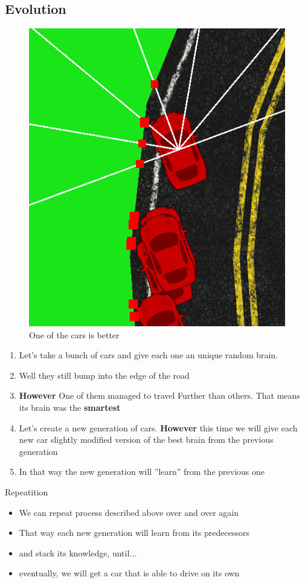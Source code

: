 \documentclass[10pt,a4paper]{article}
\begin{document}
\subsection{Evolution}
\begin{figure}[!h]
	\centering
    \includegraphics[scale=0.5]{evolution.png}
	\centering
    \caption{\tiny One of the cars is better}
\end{figure}
\begin{enumerate}
    \item Let’s take a bunch of cars and give each one an unique random brain.
    \item Well they still bump into the edge of the road
    \item \textbf{However} One of them managed to travel Further than others. That means its brain was the \textbf{smartest}
    \item Let’s create a new generation of cars. \textbf{However} this time we will give each new car slightly modified version of
    the best brain from the previous generation
    \item In that way the new generation will ”learn” from the previous one
\end{enumerate}
\Large{Repeatition}
\normalsize
\begin{itemize}
    \item We can repeat process described above over and over again
    \item That way each new generation will learn from its predecessors
    \item and stack its knowledge, until...
    \item eventually, we will get a car that is able to drive on its own
\end{itemize}
\end{document}
